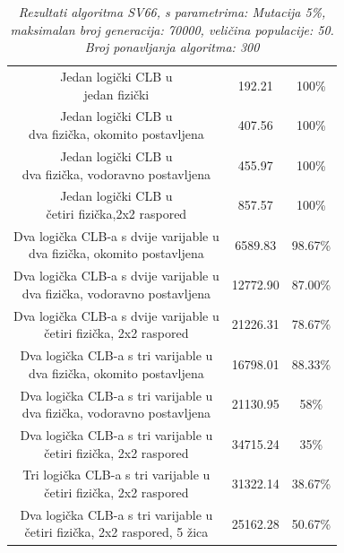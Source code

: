 \documentclass[times, utf8, zavrsni]{fer}
\begin{document}
		
		\begin{table}[htb]
			\caption{\emph{Rezultati algoritma SV66, s parametrima: Mutacija 5\%, maksimalan broj generacija: 70000, veličina populacije: 50. Broj ponavljanja algoritma: 300}}
			\label{gen-alg}
			\centering
			\begin{tabular}{|c | c| c|} \hline
				\thead{Opis} & \thead{Vrijeme u generacijama} & \thead{Uspješnost} \\ \hline
				\makecell{Jedan logički CLB u \\ jedan fizički }& 192.21 & 100\% \\ \hline
				\makecell{Jedan logički CLB u \\ dva fizička, okomito postavljena} & 407.56 & 100\% \\ \hline
				\makecell{Jedan logički CLB u \\ dva fizička, vodoravno postavljena} & 455.97 & 100\% \\ \hline
				\makecell{Jedan logički CLB u \\ četiri fizička,2x2 raspored} & 857.57 & 100\% \\ \hline
				\makecell{Dva logička CLB-a s dvije varijable u \\ dva fizička, okomito postavljena} & 6589.83 & 98.67\% \\ \hline
				\makecell{Dva logička CLB-a s dvije varijable u \\ dva fizička, vodoravno postavljena} & 12772.90 & 87.00\% \\ \hline
				\makecell{Dva logička CLB-a s dvije varijable u \\ četiri fizička, 2x2 raspored} & 21226.31 & 78.67\% \\ \hline
				\makecell{Dva logička CLB-a s tri varijable u \\ dva fizička, okomito postavljena} & 16798.01 & 88.33\% \\ \hline
				\makecell{Dva logička CLB-a s tri varijable u \\ dva fizička, vodoravno postavljena} & 21130.95 & 58\%\\ \hline
				\makecell{Dva logička CLB-a s tri varijable u \\ četiri fizička, 2x2 raspored} & 34715.24 & 35\% \\ \hline
				\makecell{Tri logička CLB-a s tri varijable u \\ četiri fizička, 2x2 raspored} & 31322.14 & 38.67\% \\ \hline
				\makecell{Dva logička CLB-a s tri varijable u \\ četiri fizička, 2x2 raspored, 5 žica} & 25162.28 & 50.67\% \\ \hline
			\end{tabular}
		\end{table}
		
\end{document}
